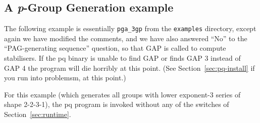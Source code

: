 \documentclass[12pt]{article}
\begin{document}
\subsection{A {\it p}-Group Generation example}\label{sec:pgrp-gen-eg}

The following example is essentially \verb|pga_3gp| from the
\texttt{examples} directory, except again we have modified the comments,
and we have also answered ``No'' to the ``PAG-generating sequence'' question,
so that {\sf GAP} is called to compute stabilisers. If the pq binary is
unable to find {\sf GAP} or finds {\sf GAP 3} instead of {\sf GAP} 4 the
program will die horribly at this point. (See Section~\ref{sec:pq-install}
if you run into problemsm, at this point.)

For this example (which generates all groups with lower exponent-3 series of
shape 2-2-3-1), the pq program is invoked without any of the switches
of Section~\ref{sec:runtime}.
\end{document}
